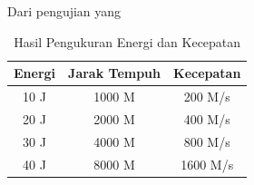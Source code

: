 Dari pengujian yang \lipsum[1]

\begin{longtable}{|c|c|c|}
  \caption{Hasil Pengukuran Energi dan Kecepatan}
  \label{tb:EnergiKecepatan}                                   \\
  \hline
  \rowcolor[HTML]{C0C0C0}
  \textbf{Energi} & \textbf{Jarak Tempuh} & \textbf{Kecepatan} \\
  \hline
  10 J            & 1000 M                & 200 M/s            \\
  20 J            & 2000 M                & 400 M/s            \\
  30 J            & 4000 M                & 800 M/s            \\
  40 J            & 8000 M                & 1600 M/s           \\
  \hline
\end{longtable}

\lipsum[2-4]
